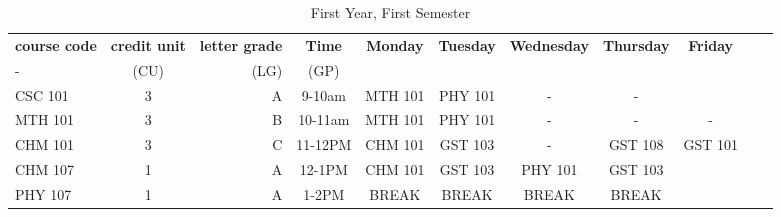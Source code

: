 \documentclass{article}
\begin{document}
	\begin{table}[h!]
	\begin{center}
	\caption {First Year, First Semester}
	\label{tab:table1}
	\begin{tabular}{l|c|r|c|c|c|c|c|c|c|c|} %
		\hline
		\textbf{course code} & \textbf{credit unit} & \textbf{letter grade} & \textbf{Time} &
		\textbf{Monday} &
		\textbf{Tuesday} &
		\textbf{Wednesday} &
		\textbf{Thursday} &
		\textbf{Friday}\\ 
	- & (CU) & (LG) & (GP) \\
		\hline
		CSC 101 & 3 & A & 9-10am & MTH 101 & PHY 101 & - & -\\
		MTH 101 & 3 & B & 10-11am &MTH 101 & PHY 101 & - & - & -\\
		CHM 101 & 3 & C  & 11-12PM & CHM 101 & GST 103 & - & GST 108 & GST 101\\
		CHM 107 & 1 & A & 12-1PM & CHM 101 & GST 103 & PHY 101 & GST 103\\
		PHY 107 & 1 & A & 1-2PM & BREAK & BREAK & BREAK & BREAK\\
	\end{tabular}
	\end{center}
	\end{table}
	
\end{document}
